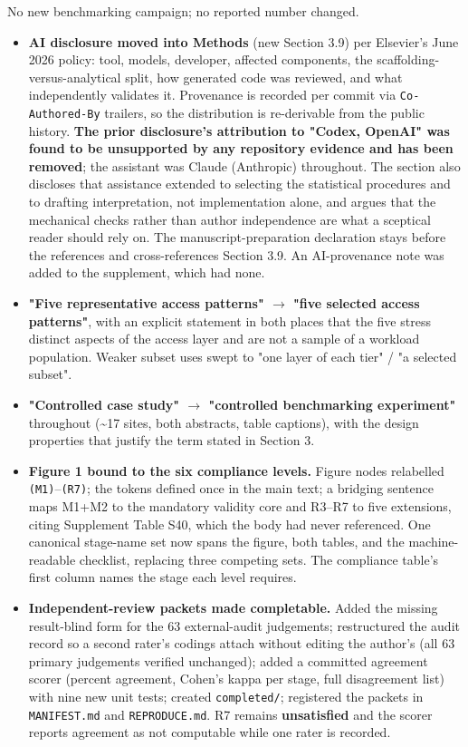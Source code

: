 \documentclass[11pt,a4paper]{article}
\begin{document}
No new benchmarking campaign; no reported number changed.

\begin{itemize}
  \item \textbf{AI disclosure moved into Methods} (new Section 3.9) per Elsevier's June 2026 policy: tool, models, developer, affected components, the scaffolding-versus-analytical split, how generated code was reviewed, and what independently validates it. Provenance is recorded per commit via \texttt{Co-Authored-By} trailers, so the distribution is re-derivable from the public history. \textbf{The prior disclosure's attribution to "Codex, OpenAI" was found to be unsupported by any repository evidence and has been removed}; the assistant was Claude (Anthropic) throughout. The section also discloses that assistance extended to selecting the statistical procedures and to drafting interpretation, not implementation alone, and argues that the mechanical checks rather than author independence are what a sceptical reader should rely on. The manuscript-preparation declaration stays before the references and cross-references Section 3.9. An AI-provenance note was added to the supplement, which had none.
  \item \textbf{"Five representative access patterns" $\to$ "five selected access patterns"}, with an explicit statement in both places that the five stress distinct aspects of the access layer and are not a sample of a workload population. Weaker subset uses swept to "one layer of each tier" / "a selected subset".
  \item \textbf{"Controlled case study" $\to$ "controlled benchmarking experiment"} throughout (\textasciitilde{}17 sites, both abstracts, table captions), with the design properties that justify the term stated in Section 3.
  \item \textbf{Figure 1 bound to the six compliance levels.} Figure nodes relabelled \texttt{(M1)}--\texttt{(R7)}; the tokens defined once in the main text; a bridging sentence maps M1+M2 to the mandatory validity core and R3--R7 to five extensions, citing Supplement Table S40, which the body had never referenced. One canonical stage-name set now spans the figure, both tables, and the machine-readable checklist, replacing three competing sets. The compliance table's first column names the stage each level requires.
  \item \textbf{Independent-review packets made completable.} Added the missing result-blind form for the 63 external-audit judgements; restructured the audit record so a second rater's codings attach without editing the author's (all 63 primary judgements verified unchanged); added a committed agreement scorer (percent agreement, Cohen's kappa per stage, full disagreement list) with nine new unit tests; created \texttt{completed/}; registered the packets in \texttt{MANIFEST.md} and \texttt{REPRODUCE.md}. R7 remains \textbf{unsatisfied} and the scorer reports agreement as not computable while one rater is recorded.

\end{itemize}
\end{document}
